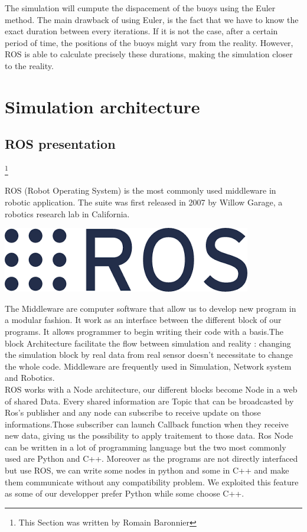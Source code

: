 \documentclass[a4paper]{report}
\begin{document}
The simulation will cumpute the dispacement of the buoys using the Euler method. The main drawback of using Euler, is the fact that we have to know the exact duration between every iterations. If it is not the case, after a certain period of time, the positions of the buoys might vary from the reality. However, ROS is able to calculate precisely these durations, making the simulation closer to the reality. 




\chapter{Simulation architecture}
\section{ROS presentation}
\footnote{This Section was written by Romain Baronnier}

ROS (Robot Operating System) is the most commonly used middleware in robotic application. The suite was first released in 2007 by Willow Garage, a robotics research lab in California.\\
\begin{center}
\includegraphics[scale=0.4]{image/ros.png}
\end{center}

The Middleware are computer software that allow us to develop new program in a modular fashion. It work as an interface between the different block of our programs. It allows programmer to begin writing their code with a basis.The block Architecture facilitate the flow between simulation and reality : changing the simulation block by real data from real sensor doesn't necessitate to change the whole code. Middleware are frequently used in Simulation, Network system and Robotics.\\

ROS works with a Node architecture, our different blocks become Node in a web of shared Data. Every shared information are Topic that can be broadcasted by Ros's publisher and any node can subscribe to receive update on those informations.Those subscriber can launch Callback function when they receive new data, giving us the possibility to apply traitement to those data. Ros Node can be written in a lot of programming language but the two most commonly used are Python and C++. Moreover as the programs are not directly interfaced but use ROS, we can write some nodes in python and some in C++ and make them communicate without any compatibility problem. We exploited this feature as some of our developper prefer Python while some choose C++.\\
\end{document}
